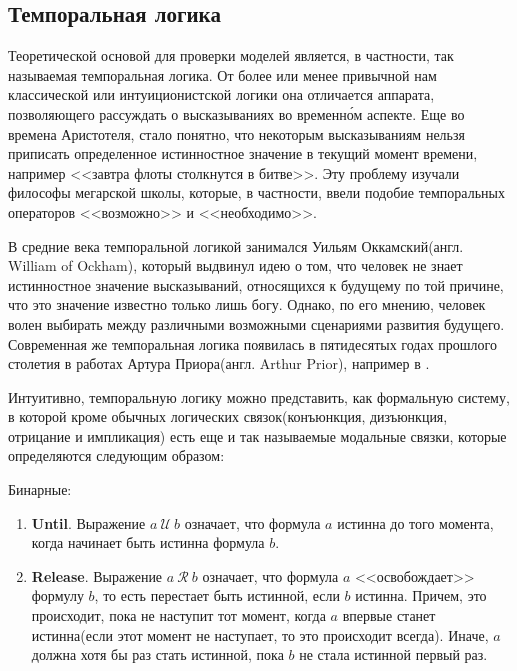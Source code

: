 \subsection{Темпоральная логика}

Теоретической основой для проверки моделей является, в частности, так называемая темпоральная логика. От более или менее привычной нам классической или интуиционистской логики она отличается аппарата, позволяющего рассуждать о высказываниях во временн\'{о}м аспекте. Еще во времена Аристотеля, стало понятно, что некоторым высказываниям нельзя приписать определенное истинностное значение в текущий момент времени, например <<завтра флоты столкнутся в битве>>. Эту проблему изучали философы мегарской школы, которые, в частности, ввели подобие темпоральных операторов <<возможно>> и <<необходимо>>.

В средние века темпоральной логикой занимался Уильям Оккамский(англ. William of Ockham), который выдвинул идею о том, что человек не знает истинностное значение высказываний, относящихся к будущему по той причине, что это значение известно только лишь богу. Однако, по его мнению, человек волен выбирать между различными возможными сценариями развития будущего. Современная же темпоральная логика появилась в пятидесятых годах прошлого столетия в работах Артура Приора(англ. Arthur Prior), например в \cite{prior1958time}.

Интуитивно, темпоральную логику можно представить, как формальную систему, в которой кроме обычных логических связок(конъюнкция, дизъюнкция, отрицание и импликация) есть еще и так называемые модальные связки, которые определяются следующим образом:

Бинарные:
\begin{enumerate}
  \item \textbf{Until}. Выражение $a\ \mathcal{U}\ b$ означает, что формула $a$ истинна до того момента, когда начинает быть истинна формула $b$.
  \item \textbf{Release}. Выражение $a\ \mathcal{R}\ b$ означает, что формула $a$ <<освобождает>> формулу $b$, то есть перестает быть истинной, если $b$ истинна. Причем, это происходит, пока не наступит тот момент, когда $a$ впервые станет истинна(если этот момент не наступает, то это происходит всегда). Иначе, $a$ должна хотя бы раз стать истинной, пока $b$ не стала истинной первый раз.
\end{enumerate}

